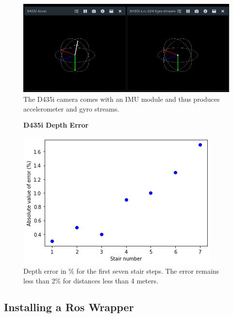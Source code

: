 \documentclass{article}
\begin{document}
\begin{figure}[h] %
    \centering
	\includegraphics[width=\textwidth,height=\textheight,keepaspectratio]{report1-img031.png} %
	\caption{The D435i camera comes with an IMU module and thus produces accelerometer and gyro streams. }
\end{figure}

\begin{figure}[h] %
    \centering
    \textbf{D435i Depth Error}\par\medskip
	\includegraphics[width=\textwidth,height=\textheight,keepaspectratio]{report1-img032.png} %
	\caption{Depth error in \% for the first seven stair steps. The error remains less than 2\% for distances less than 4 meters.}
\end{figure}

\clearpage

\subsection{Installing a Ros Wrapper}
\end{document}
